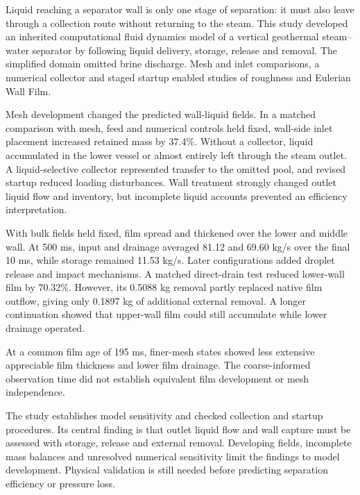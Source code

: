 \documentclass[12pt]{article}
\begin{document}
\hypersetup{pageanchor=false}

\hypersetup{pageanchor=true}

Liquid reaching a separator wall is only one stage of separation: it must also leave through a collection route without returning to the steam. This study developed an inherited computational fluid dynamics model of a vertical geothermal steam--water separator by following liquid delivery, storage, release and removal. The simplified domain omitted brine discharge. Mesh and inlet comparisons, a numerical collector and staged startup enabled studies of roughness and Eulerian Wall Film.

Mesh development changed the predicted wall-liquid fields. In a matched comparison with mesh, feed and numerical controls held fixed, wall-side inlet placement increased retained mass by 37.4\%. Without a collector, liquid accumulated in the lower vessel or almost entirely left through the steam outlet. A liquid-selective collector represented transfer to the omitted pool, and revised startup reduced loading disturbances. Wall treatment strongly changed outlet liquid flow and inventory, but incomplete liquid accounts prevented an efficiency interpretation.

With bulk fields held fixed, film spread and thickened over the lower and middle wall. At 500 ms, input and drainage averaged 81.12 and 69.60 kg/s over the final 10 ms, while storage remained 11.53 kg/s. Later configurations added droplet release and impact mechanisms. A matched direct-drain test reduced lower-wall film by 70.32\%. However, its 0.5088 kg removal partly replaced native film outflow, giving only 0.1897 kg of additional external removal. A longer continuation showed that upper-wall film could still accumulate while lower drainage operated.

At a common film age of 195 ms, finer-mesh states showed less extensive appreciable film thickness and lower film drainage. The coarse-informed observation time did not establish equivalent film development or mesh independence.

The study establishes model sensitivity and checked collection and startup procedures. Its central finding is that outlet liquid flow and wall capture must be assessed with storage, release and external removal. Developing fields, incomplete mass balances and unresolved numerical sensitivity limit the findings to model development. Physical validation is still needed before predicting separation efficiency or pressure loss.
\end{document}
